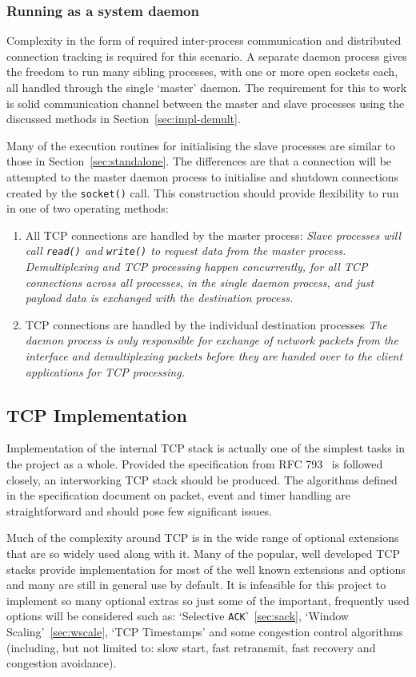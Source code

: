 \documentclass[11pt,a4paper,british]{bhamarticle}
\begin{document}
\begin{multicols}{2}
\subsubsection{Running as a system daemon}
Complexity in the form of required inter-process communication and distributed connection tracking is required for this scenario. A separate daemon process gives the freedom to run many sibling processes, with one or more open sockets each, all handled through the single `master' daemon. The requirement for this to work is solid communication channel between the master and slave processes using the discussed methods in Section~\ref{sec:impl-demult}.

Many of the execution routines for initialising the slave processes are similar to those in Section~\ref{sec:standalone}. The differences are that a connection will be attempted to the master daemon process to initialise and shutdown connections created by the \texttt{socket()} call. This construction should provide flexibility to run in one of two operating methods:
\begin{enumerate}
    \item{All TCP connections are handled by the master process}: \textit{Slave processes will call \texttt{read()} and \texttt{write()} to request data from the master process. Demultiplexing and TCP processing happen concurrently, for all TCP connections across all processes, in the single daemon process, and just payload data is exchanged with the destination process.}
    \item{TCP connections are handled by the individual destination processes} \textit{The daemon process is only responsible for exchange of network packets from the interface and demultiplexing packets before they are handed over to the client applications for TCP processing.}
\end{enumerate}

\subsection{TCP Implementation}
Implementation of the internal TCP stack is actually one of the simplest tasks in the project as a whole. Provided the specification from RFC 793~\cite{rfc793} is followed closely, an interworking TCP stack should be produced. The algorithms defined in the specification document on packet, event and timer handling are straightforward and should pose few significant issues.

Much of the complexity around TCP is in the wide range of optional extensions that are so widely used along with it. Many of the popular, well developed TCP stacks provide implementation for most of the well known extensions and options and many are still in general use by default. It is infeasible for this project to implement so many optional extras so just some of the important, frequently used options will be considered such as: `Selective \texttt{ACK}'~\ref{sec:sack}, `Window Scaling'~\ref{sec:wscale}, `TCP Timestamps' and some congestion control algorithms (including, but not limited to: slow start, fast retransmit, fast recovery and congestion avoidance).


\end{multicols}
\end{document}
